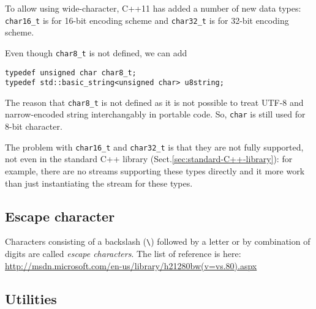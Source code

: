 To allow using wide-character, C++11 has added a number of new data types:
\verb!char16_t! is for 16-bit encoding scheme and \verb!char32_t!
is for 32-bit encoding scheme.

Even though \verb!char8_t! is not defined, we can add
\begin{verbatim}
typedef unsigned char char8_t; 
typedef std::basic_string<unsigned char> u8string; 
\end{verbatim}
The reason that \verb!char8_t! is not defined as it is not possible to treat
UTF-8 and narrow-encoded string interchangably in portable code. So, \verb!char!
is still used for 8-bit character.

The problem with \verb!char16_t! and \verb!char32_t! is that they are not fully
supported, not even in the standard C++ library
(Sect.\ref{sec:standard-C++-library}): for example, there are no streams
supporting these types directly and it more work than just instantiating the
stream for these types.


\subsection{Escape character}
\label{sec:escape_char}

Characters consisting of a backslash (\verb!\!) followed by a letter or by
combination of digits are called {\it escape characters}. The list of reference is here:
\url{http://msdn.microsoft.com/en-us/library/h21280bw(v=vs.80).aspx}

\subsection{Utilities}
\label{sec:C-char_utilities}

